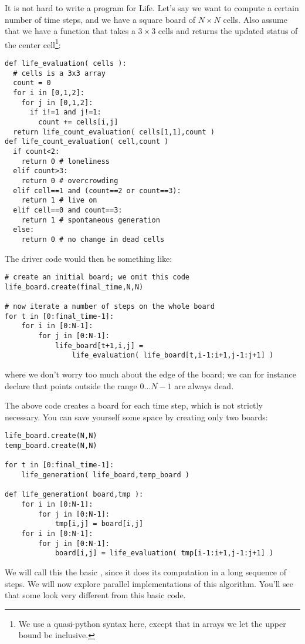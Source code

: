 It is not hard to write a program for Life. Let's say we want to compute a certain
number of time steps, and we have a square board of $N\times N$ cells.
Also assume that we have a function  that takes a
$3\times3$ cells and returns the updated status of the center cell\footnote{We
use a quasi-python syntax here, except that in arrays we let the upper bound 
be inclusive.}:
\begin{verbatim}
def life_evaluation( cells ):
  # cells is a 3x3 array
  count = 0
  for i in [0,1,2]:
    for j in [0,1,2]:
      if i!=1 and j!=1:
        count += cells[i,j]
  return life_count_evaluation( cells[1,1],count )
def life_count_evaluation( cell,count )
  if count<2:
    return 0 # loneliness
  elif count>3:
    return 0 # overcrowding
  elif cell==1 and (count==2 or count==3):
    return 1 # live on
  elif cell==0 and count==3:
    return 1 # spontaneous generation
  else:
    return 0 # no change in dead cells
\end{verbatim}

The driver code would then be something like:
\begin{verbatim}
# create an initial board; we omit this code
life_board.create(final_time,N,N)

# now iterate a number of steps on the whole board
for t in [0:final_time-1]:
    for i in [0:N-1]:
        for j in [0:N-1]:
            life_board[t+1,i,j] = 
                life_evaluation( life_board[t,i-1:i+1,j-1:j+1] )
\end{verbatim}
where we don't worry too much about the edge of the board;
we can for instance declare that points outside the range $0\ldots N-1$ 
are always dead.

The above code creates a board for each time step, which
is not strictly necessary. You can save yourself some space
by creating only two boards:
\begin{verbatim}
life_board.create(N,N)
temp_board.create(N,N)

for t in [0:final_time-1]:
    life_generation( life_board,temp_board )

def life_generation( board,tmp ):
    for i in [0:N-1]:
        for j in [0:N-1]:
            tmp[i,j] = board[i,j]
    for i in [0:N-1]:
        for j in [0:N-1]:
            board[i,j] = life_evaluation( tmp[i-1:i+1,j-1:j+1] )
\end{verbatim}
We will call this the basic , since it does
its computation in a long sequence of steps. We will now explore parallel
implementations of this algorithm. You'll see that some look very different 
from this basic code.

